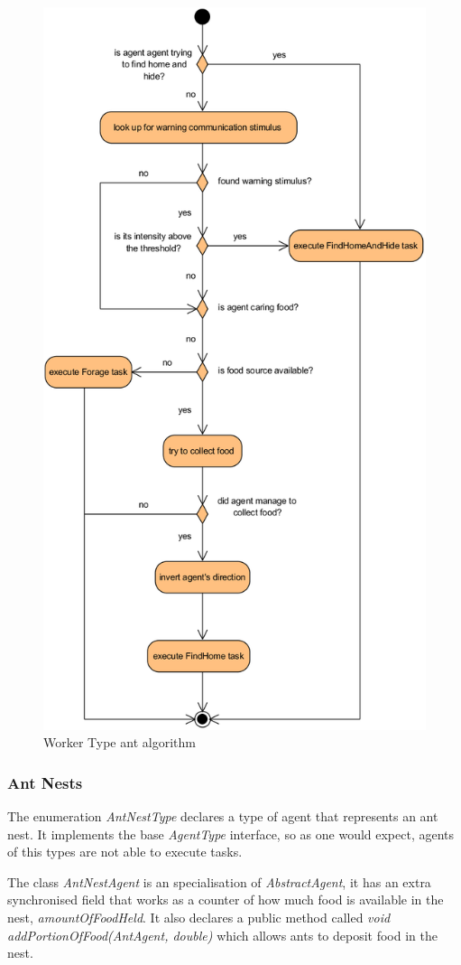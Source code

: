 \begin{figure}[H]
  \centering
  \includegraphics[width=0.8\linewidth]{gfx/uml-worker-type.png}
  \caption{Worker Type ant algorithm}
  \label{fig:worker-type}
\end{figure}

\subsubsection{Ant Nests}

The enumeration \emph{AntNestType} declares a type of agent that represents an ant nest. It implements the base \emph{AgentType} interface, so as one would expect, agents of this types are not able to execute tasks.

The class \emph{AntNestAgent} is an specialisation of \emph{AbstractAgent}, it has an extra synchronised field that works as a counter of how much food is available in the nest, \emph{amountOfFoodHeld}. It also declares a public method called \emph{void addPortionOfFood(AntAgent, double)} which allows ants to deposit food in the nest.

